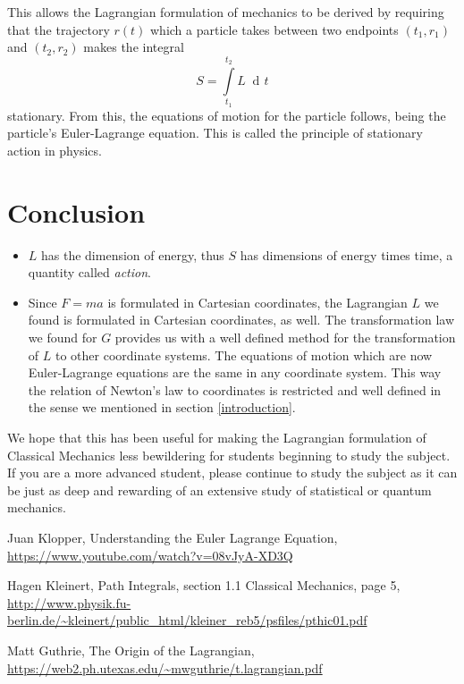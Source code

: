 \documentclass[prb,preprint]{revtex4-1}
\DeclareMathOperator{\dd}{d\!}
\begin{document}
This allows the Lagrangian formulation of mechanics to be derived by requiring that the trajectory $r(t)$ which a particle takes between two endpoints $(t_1,r_1)$ and $(t_2,r_2)$ makes the integral
\begin{equation}
S=\int\limits_{t_1}^{t_2} L \; \dd t
\end{equation}
stationary. From this, the equations of motion for the particle follows, being the particle's Euler-Lagrange equation. This is called the principle of stationary action in physics. 

\section{Conclusion}

\begin{itemize}
\item $L$ has the dimension of energy, thus $S$ has dimensions of energy times time, a quantity called \emph{action}.
\item Since $F=ma$ is formulated in Cartesian coordinates, the Lagrangian $L$ we found is formulated in Cartesian coordinates, as well. The transformation law we found for $G$ provides us with a well defined method for the transformation of $L$ to other coordinate systems. The equations of motion which are now Euler-Lagrange equations are the same in any coordinate system. 
This way the relation of Newton's law to coordinates is restricted and well defined in the sense we mentioned in section \ref{introduction}.
\end{itemize}

We hope that this has been useful for making the Lagrangian formulation of Classical Mechanics less bewildering for students beginning to study the subject. If you are a more advanced student, please continue to study the subject as it can be just as deep and rewarding of an extensive study of statistical or quantum mechanics. 


\begin{thebibliography}{9}

 Juan Klopper, Understanding the Euler Lagrange Equation, \url{https://www.youtube.com/watch?v=08vJyA-XD3Q}

 Hagen Kleinert, Path Integrals, section 1.1 Classical Mechanics, page 5, \url{http://www.physik.fu-berlin.de/~kleinert/public_html/kleiner_reb5/psfiles/pthic01.pdf}

 Matt Guthrie, The Origin of the Lagrangian, \url{https://web2.ph.utexas.edu/~mwguthrie/t.lagrangian.pdf}

\end{thebibliography}
\end{document}
